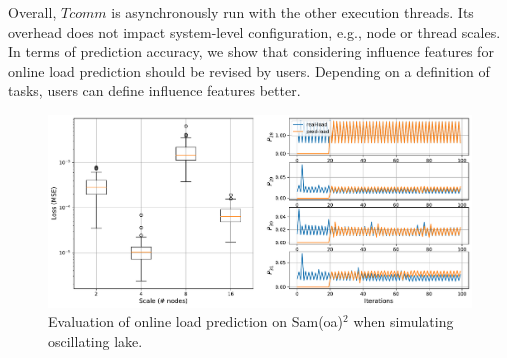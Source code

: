 Overall, $Tcomm$ is asynchronously run with the other execution threads. Its overhead does not impact system-level configuration, e.g., node or thread scales. In terms of prediction accuracy, we show that considering influence features for online load prediction should be revised by users. Depending on a definition of tasks, users can define influence features better.\\

\begin{figure}[t]
\centering
\includegraphics[scale=0.475]{./pictures/evaluation/eval_loss_and_realvspred_comparison_R28_R31.pdf}
\caption{Evaluation of online load prediction on Sam(oa)$^2$ when simulating oscillating lake.}
\label{fig:online_pred_results_samoa}
\end{figure}

